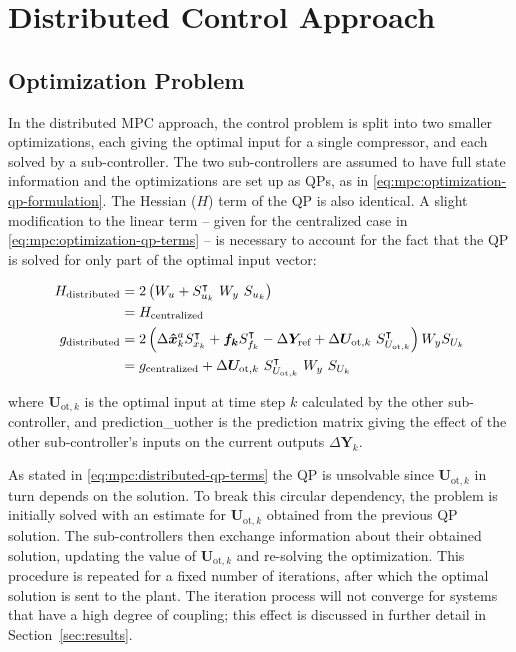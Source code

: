 \section{Distributed Control Approach}
\label{sec:mpc:distributed}

\subsection{Optimization Problem}

In the distributed MPC approach, the control problem is split into two smaller optimizations, each giving the optimal input for a single compressor, and each solved by a sub-controller.
The two sub-controllers are assumed to have full state information and the optimizations are set up as QPs, as in \eqref{eq:mpc:optimization-qp-formulation}. The Hessian ($H$) term of the QP is also identical. A slight modification to the linear term -- given for the centralized case in \eqref{eq:mpc:optimization-qp-terms} -- is necessary to account for the fact that the QP is solved for only part of the optimal input vector:

\begin{equation}
  \begin{split}
    H\ut{distributed} & = 2\left( W_u + S_{u_k}^\intercal\ W_y\ S_{u_k} \right)\\
    & = H\ut{centralized}\\
    g\ut{distributed} & = 2\left( \Delta\bm{\hat{x}}_k^a S_{x_k}^\intercal + \bm{f_k} S_{f_k}^\intercal - \Delta \bm{Y}\ut{ref} + \Delta\bm{U}_{\text{ot},k}\ S_{U_{\text{ot},k}}^\intercal \right)W_y S_{U_k}\\
    & = g\ut{centralized} + \Delta\bm{U}_{\text{ot},k}\ S_{U_{\text{ot},k}}^\intercal\ W_y\ S_{U_k}
  \end{split}
  \label{eq:mpc:distributed-qp-terms}
\end{equation}

\noindent where $\bm{U}_{\text{ot},k}$ is the optimal input at time step $k$ calculated by the other sub-controller, and \gls{prediction_uother} is the prediction matrix giving the effect of the other sub-controller's inputs on the current outputs $\Delta \bm{Y}_k$.

As stated in \eqref{eq:mpc:distributed-qp-terms} the QP is unsolvable since  $\bm{U}_{\text{ot},k}$ in turn depends on the solution.
To break this circular dependency, the problem is initially solved with an estimate for $\bm{U}_{\text{ot},k}$ obtained from the previous QP solution.
The sub-controllers then exchange information about their obtained solution, updating the value of $\bm{U}_{\text{ot},k}$ and re-solving the optimization.
This procedure is repeated for a fixed number of iterations, after which the optimal solution is sent to the plant.
The iteration process will not converge for systems that have a high degree of coupling; this effect is discussed in further detail in Section~\ref{sec:results}.

